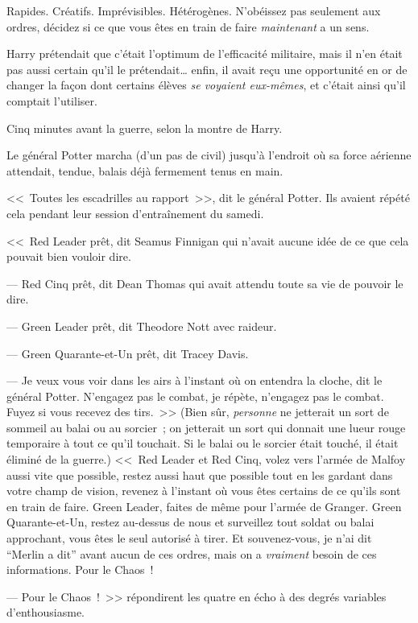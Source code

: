 Rapides. Créatifs. Imprévisibles. Hétérogènes. N'obéissez pas seulement aux ordres, décidez si ce que vous êtes en train de faire \emph{maintenant} a un sens.

Harry prétendait que c'était l'optimum de l'efficacité militaire, mais il n'en était pas aussi certain qu'il le prétendait… enfin, il avait reçu une opportunité en or de changer la façon dont certains élèves \emph{se voyaient eux-mêmes}, et c'était ainsi qu'il comptait l'utiliser.

Cinq minutes avant la guerre, selon la montre de Harry.

Le général Potter marcha (d'un pas de civil) jusqu'à l'endroit où sa force aérienne attendait, tendue, balais déjà fermement tenus en main.

<<~Toutes les escadrilles au rapport~>>, dit le général Potter. Ils avaient répété cela pendant leur session d'entraînement du samedi.

<<~Red Leader prêt, dit Seamus Finnigan qui n'avait aucune idée de ce que cela pouvait bien vouloir dire.

--- Red Cinq prêt, dit Dean Thomas qui avait attendu toute sa vie de pouvoir le dire.

--- Green Leader prêt, dit Theodore Nott avec raideur.

--- Green Quarante-et-Un prêt, dit Tracey Davis.

--- Je veux vous voir dans les airs à l'instant où on entendra la cloche, dit le général Potter. N'engagez pas le combat, je répète, n'engagez pas le combat. Fuyez si vous recevez des tirs.~>> (Bien sûr, \emph{personne} ne jetterait un sort de sommeil au balai ou au sorcier~; on jetterait un sort qui donnait une lueur rouge temporaire à tout ce qu'il touchait. Si le balai ou le sorcier était touché, il était éliminé de la guerre.) <<~Red Leader et Red Cinq, volez vers l'armée de Malfoy aussi vite que possible, restez aussi haut que possible tout en les gardant dans votre champ de vision, revenez à l'instant où vous êtes certains de ce qu'ils sont en train de faire. Green Leader, faites de même pour l'armée de Granger. Green Quarante-et-Un, restez au-dessus de nous et surveillez tout soldat ou balai approchant, vous êtes le seul autorisé à tirer. Et souvenez-vous, je n'ai dit “Merlin a dit” avant aucun de ces ordres, mais on a \emph{vraiment} besoin de ces informations. Pour le Chaos~!

--- Pour le Chaos~!~>> répondirent les quatre en écho à des degrés variables d'enthousiasme.

